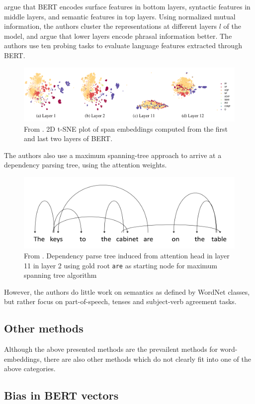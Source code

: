 \documentclass[a4paper,12pt,twoside,openright]{report}
\begin{document}
\cite{jawahar19} argue that BERT encodes surface features in bottom layers, syntactic features in middle layers, and semantic features in top layers.
Using normalized mutual information, the authors cluster the representations at different layers $l$ of the model, and argue that lower layers encode phrasal information better.
The authors use ten probing tasks to evaluate language features extracted through BERT.

\begin{figure}[H]
	\center
  \includegraphics[width=0.4\linewidth]{./assets/relatedwork/BERT_tsne_layers.png}
  \caption{From \cite{jawahar19}. 2D t-SNE plot of span embeddings computed from the first and last two layers of BERT.}
  \label{fig:cold_fictional_desired}
\end{figure}

The authors also use a maximum spanning-tree approach to arrive at a dependency parsing tree, using the attention weights.

\begin{figure}[H]
	\center
  \includegraphics[width=0.4\linewidth]{./assets/relatedwork/BERT_dependency_parsing.png}
  \caption{From \cite{jawahar19}. Dependency parse tree induced from attention head in layer 11 in layer 2 using gold root \texttt{are} as starting node for maximum spanning tree algorithm}
  \label{fig:cold_fictional_desired}
\end{figure}

However, the authors do little work on semantics as defined by WordNet classes, but rather focus on part-of-speech, tenses and subject-verb agreement tasks.

\subsection{Other methods}

Although the above presented methods are the prevailent methods for word-embeddings, there are also other methods which do not clearly fit into one of the above categories.

\subsection{Bias in BERT vectors}
\end{document}
